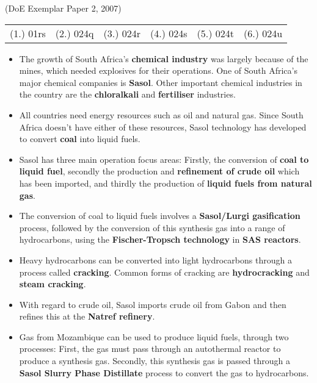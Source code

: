 {(DoE Exemplar Paper 2, 2007)

\par \practiceinfo
\par \begin{tabular}[h]{cccccc}
(1.)	01rs	&
(2.) 024q	&
(3.) 024r	&
(4.) 024s	&
(5.) 024t	&
(6.) 024u	\\
\end{tabular}
}


\begin{itemize}
\item{The growth of South Africa's \textbf{chemical industry} was largely because of the mines, which needed explosives for their operations. One of South Africa's major chemical companies is \textbf{Sasol}. Other important chemical industries in the country are the \textbf{chloralkali} and \textbf{fertiliser} industries.}
\item{All countries need energy resources such as oil and natural gas. Since South Africa doesn't have either of these resources, Sasol technology has developed to convert \textbf{coal} into liquid fuels.}
\item{Sasol has three main operation focus areas: Firstly, the conversion of \textbf{coal to liquid fuel}, secondly the production and \textbf{refinement of crude oil} which has been imported, and thirdly the production of \textbf{liquid fuels from natural gas}.}
\item{The conversion of coal to liquid fuels involves a \textbf{Sasol/Lurgi gasification} process, followed by the conversion of this synthesis gas into a range of hydrocarbons, using the \textbf{Fischer-Tropsch technology} in \textbf{SAS reactors}.}
\item{Heavy hydrocarbons can be converted into light hydrocarbons through a process called \textbf{cracking}. Common forms of cracking are \textbf{hydrocracking} and \textbf{steam cracking}.}
\item{With regard to crude oil, Sasol imports crude oil from Gabon and then refines this at the \textbf{Natref refinery}.}
\item{Gas from Mozambique can be used to produce liquid fuels, through two processes: First, the gas must pass through an autothermal reactor to produce a synthesis gas. Secondly, this synthesis gas is passed through a \textbf{Sasol Slurry Phase Distillate} process to convert the gas to hydrocarbons.}

\end{itemize}

